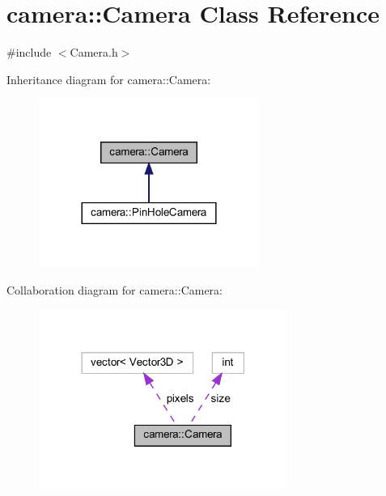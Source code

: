 \hypertarget{classcamera_1_1Camera}{}\section{camera\+::Camera Class Reference}
\label{classcamera_1_1Camera}


{\ttfamily \#include $<$Camera.\+h$>$}



Inheritance diagram for camera\+::Camera\+:
\nopagebreak
\begin{figure}[H]
\begin{center}
\leavevmode
\includegraphics[width=204pt]{classcamera_1_1Camera__inherit__graph}
\end{center}
\end{figure}


Collaboration diagram for camera\+::Camera\+:
\nopagebreak
\begin{figure}[H]
\begin{center}
\leavevmode
\includegraphics[width=230pt]{classcamera_1_1Camera__coll__graph}
\end{center}
\end{figure}
